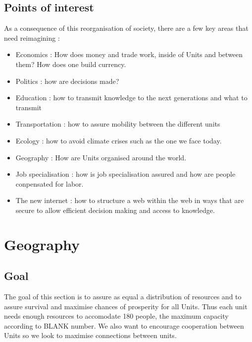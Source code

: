 \documentclass[12pt]{article}
\begin{document}
\subsection{Points of interest}
As a consequence of this reorganisation of society, there are a few key areas that need reimagining : 
\begin{itemize}
    \item Economics : How does money and trade work, inside of Units and between them? How does one build currency.
    \item Politics : how are decisions made? 
    \item Education : how to transmit knowledge to the next generations and what to transmit
    \item Transportation : how to assure mobility between the different units
    \item Ecology : how to avoid climate crises such as the one we face today.
    \item Geography : How are Units organised around the world.
    \item Job specialisation : how is job specialisation assured and how are people conpensated for labor.
    \item The new internet : how to structure a web within the web in ways that are secure to allow efficient decision making and access to knowledge.  
\end{itemize}

\section{Geography}
\subsection{Goal}
The goal of this section is to assure as equal a distribution of resources and to assure survival and maximise chances of prosperity for all Units. Thus each unit needs enough resources to accomodate 180 people, the maximum capacity according to BLANK number. We also want to encourage cooperation between Units so we look to maximise connections between units. 
\end{document}
